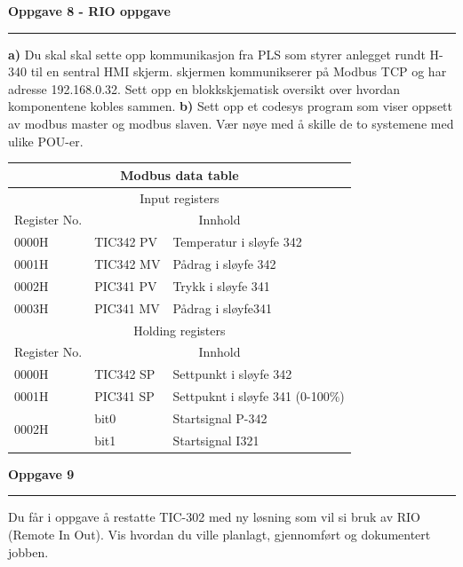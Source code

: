 \textbf{Oppgave 8 - RIO oppgave}
\vskip 5pt
\hrule

\vskip 5pt
\textbf{a) }Du skal skal sette opp kommunikasjon fra PLS som styrer anlegget rundt H-340 til en sentral HMI skjerm. skjermen kommunikserer på Modbus TCP og har adresse 192.168.0.32. Sett opp en blokkskjematisk oversikt over hvordan komponentene kobles sammen. 
\vskip 10pt 
\textbf{b) }Sett opp et codesys program som viser oppsett av modbus master og modbus slaven. Vær nøye med å skille de to systemene med ulike POU-er.
\small

\begin{center}
\begin{tabular}{ | m{2cm} | m{2.5cm}| m{11cm} |} 
\hline
\multicolumn{3}{|c|}{Modbus data table} \\
\hline
\multicolumn{3}{|c|}{Input registers}\\
\hline
Register No.&\multicolumn{2}{c|}{Innhold} \\
\hline
0000H&TIC342 PV&Temperatur i sløyfe 342\\
\hline
0001H&TIC342 MV&Pådrag i sløyfe 342\\
\hline
	0002H&PIC341 PV &Trykk i sløyfe 341\\
\hline
	0003H&PIC341 MV& Pådrag i sløyfe341\\
\hline
\multicolumn{3}{|c|}{Holding registers}\\
\hline
Register No.&\multicolumn{2}{c|}{Innhold} \\
\hline
	0000H&TIC342 SP& Settpunkt i sløyfe 342\\
\hline
	0001H&PIC341 SP&Settpuknt i sløyfe 341 (0-100\%)\\
\hline
	\multirow{2}{*}{0002H}&bit0&Startsignal P-342\\
	\cline{2-3}
&bit1&Startsignal I321\\
\hline
\end{tabular}
\end{center}
\normalsize


\filbreak
\vfil \eject
\textbf{Oppgave 9}
\vskip 5pt
\hrule
\vskip 5pt
Du får i oppgave å restatte TIC-302 med ny løsning som vil si bruk av RIO (Remote In Out). 
\vskip 5pt 
Vis hvordan du ville planlagt, gjennomført og dokumentert jobben. 


\vfil \eject



